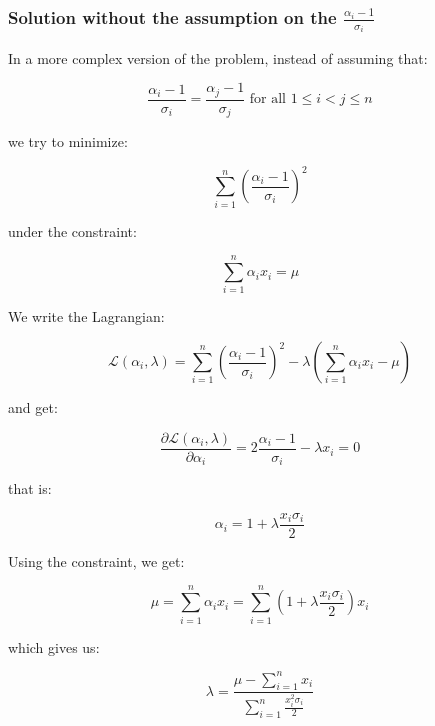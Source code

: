 \subsubsection{Solution without the assumption on the $\frac{\alpha_i - 1}{\sigma_i}$}

In a more complex version of the problem, instead of assuming that:

\begin{equation*}
\frac{\alpha_i - 1}{\sigma_i} = \frac{\alpha_j - 1}{\sigma_j} \text{ for all } 1 \leq i < j \leq n
\end{equation*}

we try to minimize:

\begin{equation*}
\sum_{i = 1}^n \left( \frac{\alpha_i - 1}{\sigma_i} \right) ^2
\end{equation*}

under the constraint:

\begin{equation*}
\sum_{i = 1}^n \alpha_i x_i = \mu
\end{equation*}

We write the Lagrangian:

\begin{equation*}
\mathcal{L} \left( \alpha_i , \lambda \right) = \sum_{i = 1}^n \left( \frac{\alpha_i - 1}{\sigma_i} \right) ^2 - \lambda \left( \sum_{i = 1}^n \alpha_i x_i - \mu \right)
\end{equation*}

and get:

\begin{equation*}
\frac{\partial \mathcal{L} \left( \alpha_i , \lambda \right)}{\partial \alpha_i} = 2 \frac{\alpha_i - 1}{\sigma_i} - \lambda x_i = 0
\end{equation*}

that is:

\begin{equation*}
\alpha_i = 1 + \lambda \frac{x_i \sigma_i}{2}
\end{equation*}

Using the constraint, we get:

\begin{equation*}
\mu = \sum_{i = 1}^n \alpha_i x_i = \sum_{i = 1}^n \left( 1 + \lambda \frac{x_i \sigma_i}{2} \right) x_i
\end{equation*}

which gives us:

\begin{equation*}
\lambda = \frac{\mu - \sum_{i = 1}^n x_i}{\sum_{i = 1}^n \frac{x_i^2 \sigma_i}{2}}
\end{equation*}

